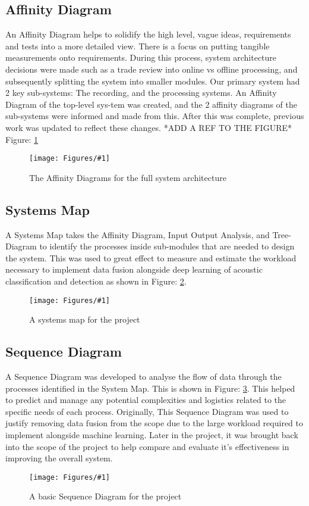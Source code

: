 \documentclass{UoNMCHA}
\newcommand{\fref}[1] {Figure: \ref{#1}}
\newcommand{\fFigure}[3]{
	\begin{figure}[h]
        \begin{center}  
            \texttt{[image: Figures/\#1]}  
            \caption{#2}
            \label{#1}
        \end{center}
	\end{figure}
}
\numberwithin{equation}{section}
\begin{document}
\subsection{Affinity Diagram}
An Affinity Diagram helps to solidify the high level, vague ideas, requirements and tests into a more detailed view. There is a focus on putting tangible measurements onto requirements. During this process, system architecture decisions were made such as a trade review into online vs offline processing, and subsequently splitting the system into smaller modules. Our primary system had 2 key sub-systems: The recording, and the processing systems. An Affinity Diagram of the top-level sys-tem was created, and the 2 affinity diagrams of the sub-systems were informed and made from this. After this was complete, previous work was updated to reflect these changes. *ADD A REF TO THE FIGURE* \fref{AffinityDiagram.png}
\fFigure{AffinityDiagram.png}{The Affinity Diagrams for the full system architecture}{0.8}

\subsection{Systems Map}
A Systems Map takes the Affinity Diagram, Input Output Analysis, and Tree-Diagram to identify the processes inside sub-modules that are needed to design the system. This was used to great effect to measure and estimate the workload necessary to implement data fusion alongside deep learning of acoustic classification and detection as shown in \fref{SystemMap.png}.
\fFigure{SystemMap.png}{A systems map for the project}{0.8}


\subsection{Sequence Diagram}
A Sequence Diagram was developed to analyse the flow of data through the processes identified in the System Map. This is shown in \fref{SequenceDiagram.png}. This helped to predict and manage any potential complexities and logistics related to the specific needs of each process. 
Originally, This Sequence Diagram was used to justify removing data fusion from the scope due to the large workload required to implement alongside machine learning. Later in the project, it was brought back into the scope of the project to help compare and evaluate it's effectiveness in improving the overall system. 
\fFigure{SequenceDiagram.png}{A basic Sequence Diagram for the project}{0.8}
\end{document}
